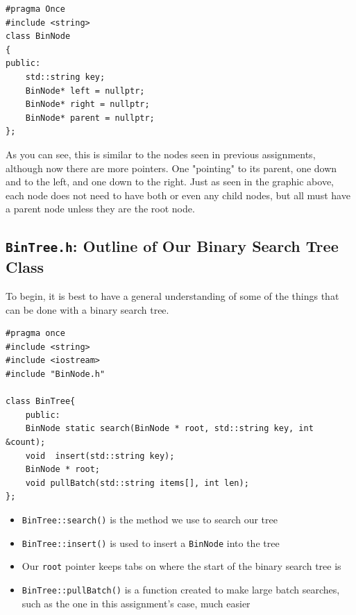 \documentclass[letterpaper, 10pt]{article}
\begin{document}
\begin{addmargin}[-5em]{1em}
\begin{small}
\begin{verbatim}
#pragma Once
#include <string>
class BinNode
{ 
public:
	std::string key; 
	BinNode* left = nullptr;		 
    BinNode* right = nullptr;
	BinNode* parent = nullptr;
};

\end{verbatim}
\end{small}
\end{addmargin}


As you can see, this is similar to the nodes seen in previous assignments, although now there are more pointers. One "pointing" to its parent, one down and to the left, and one down to the right. Just as seen in the graphic above, each node does not need to have both or even any child nodes, but all must have a parent node unless they are the root node.

\subsection{\texttt{BinTree.h}: Outline of Our Binary Search Tree Class}
 To begin, it is best to have a general understanding of some of the things that can be done with a binary search tree.
 
 \begin{addmargin}[-5em]{1em}
\begin{small}
\begin{verbatim}
#pragma once
#include <string>
#include <iostream>
#include "BinNode.h"

class BinTree{
    public:
    BinNode static search(BinNode * root, std::string key, int &count);
    void  insert(std::string key);
    BinNode * root;
    void pullBatch(std::string items[], int len);
};
\end{verbatim}
\end{small}
\end{addmargin}

\begin{itemize}
   \item \texttt{BinTree::search()} is the method we use to search our tree
   \item \texttt{BinTree::insert()} is used to insert a \texttt{BinNode} into the tree
   \item Our \texttt{root} pointer keeps tabs on where the start of the binary search tree is
   \item \texttt{BinTree::pullBatch()} is a function created to make large batch searches, such as the one in this assignment's case, much easier
   
\end{itemize}
\newpage
\end{document}
